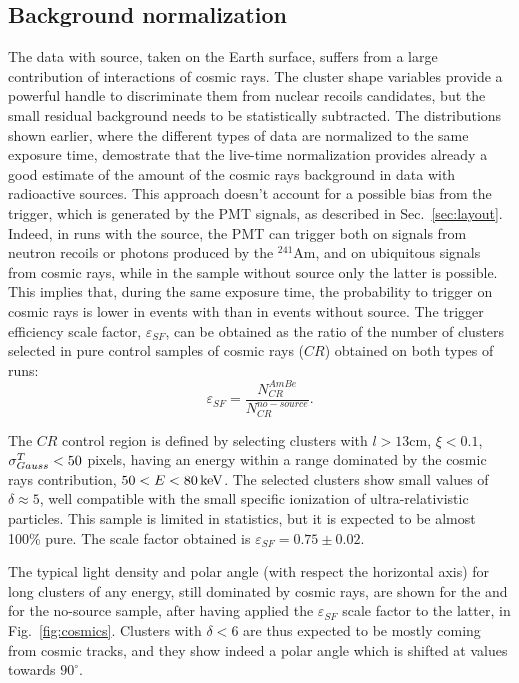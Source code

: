 \subsection{Background normalization}
\label{sec:background}
The data with \ambe source, taken on the Earth surface, suffers from a
large contribution of interactions of cosmic rays. The cluster shape
variables provide a powerful handle to discriminate them from nuclear
recoils candidates, but the small residual background needs to be
statistically subtracted. The distributions shown earlier, where the
different types of data are normalized to the same exposure time,
demostrate that the live-time normalization provides already a good
estimate of the amount of the cosmic rays background in data with
radioactive sources. This approach doesn't account for a possible bias
from the trigger, which is generated by the PMT signals, as described
in Sec.~\ref{sec:layout}. Indeed, in runs with the \ambe source, the
PMT can trigger both on signals from neutron recoils or photons
produced by the $^{241}$Am, and on ubiquitous signals from cosmic
rays, while in the sample without source only the latter is possible.
This implies that, during the same exposure time, the probability to
trigger on cosmic rays is lower in events with \ambe than in events
without source. The trigger efficiency scale factor,
$\varepsilon_{SF}$, can be obtained as the ratio of the number of
clusters selected in pure control samples of cosmic rays ($CR$)
obtained on both types of runs:
\begin{equation}
\label{eq:sfeff}
\varepsilon_{SF} = \frac{N^{AmBe}_{CR}}{N^{no-source}_{CR}}.
\end{equation}

The $CR$ control region is defined by selecting clusters with
$l>13$\unit{cm}, $\xi<0.1$, $\sigma^T_{Gauss}<50$ pixels, having an energy
within a range dominated by the cosmic rays contribution,
$50<E<80\,\textrm{ke\hspace{-.08em}V}$. The selected clusters show small values of
$\delta\approx5$, well compatible with the small specific ionization
of ultra-relativistic particles.  This sample is limited in
statistics, but it is expected to be almost 100\% pure. The scale
factor obtained is $\varepsilon_{SF}=0.75\pm0.02$.

The typical light density and polar angle (with respect the horizontal
axis) for long clusters of any energy, still dominated by cosmic rays,
are shown for the \ambe and for the no-source sample, after having
applied the $\varepsilon_{SF}$ scale factor to the latter, in
Fig.~\ref{fig:cosmics}. Clusters with $\delta<6$ are thus expected to
be mostly coming from cosmic tracks, and they show indeed a polar
angle which is shifted at values towards $90^\circ$.


